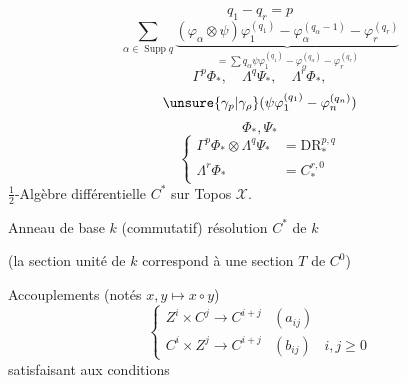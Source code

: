 \[
q_1-q_r=p
\]
\diagram{\begin{tikzcd}[row sep=large]
\Gamma^2\Phi_*\otimes\Psi_*\arrow[d,bend left=35,"?"]\\
\Gamma^2\Phi_*\otimes\Phi_*\arrow[u]\\
\Gamma^2\Phi_*\arrow[u]\\
0\arrow[u]
\end{tikzcd}}
\[
\sum_{\alpha\in\operatorname{Supp}q}
\underbrace{(\varphi_\alpha\otimes\psi)
\varphi_1^{(q_1)}-\varphi_\alpha^{(q_\alpha-1)}-\varphi_r^{(q_r)}}_{
\displaystyle=\sum q_\alpha\psi\varphi_1^{(q_1)}-\varphi_\alpha^{(q_\alpha)}-\varphi_r^{(q_r)}}
\]
\[
\Gamma^p\Phi_*,\quad\Lambda^q\Psi_*,\quad\Lambda^r\Phi_*,
\]
\[
\unsure{\gamma_p|\gamma_\rho}(\psi\varphi_1^{(q_1)}-\varphi_n^{(q_n)})
\]
\[
\Phi_*,\Psi_*
\]
\[
\left\{\begin{aligned}
\Gamma^p\Phi_*\otimes\Lambda^q\Psi_*&=\mathrm{DR}_*^{p,q}\\
\Lambda^r\Phi_*&=C_*^{r,0}
\end{aligned}\right.
\]
$\frac12$-Algèbre différentielle $C^*$ sur Topos $\mathcal X$.

Anneau de base $k$ (commutatif)
résolution $C^*$ de $k$



(la section unité de $k$ correspond à une section $T$ de $C^0$)


Accouplements (notés $x,y\longmapsto x\circ y$)
\[
\left\{\begin{array}{lll}
Z^i\times C^j\longrightarrow C^{i+j}&(a_{ij})\\
C^i\times Z^j\longrightarrow C^{i+j}&(b_{ij})&i,j\geq0
\end{array}\right.
\]
satisfaisant aux conditions

